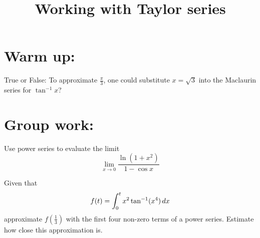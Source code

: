 \documentclass[]{ximera}
\title{Working with Taylor series}
\begin{document}
\begin{abstract}		\end{abstract}
\maketitle



\section{Warm up:}
True or False:  To approximate $\frac{\pi}{3}$, one could substitute $x = \sqrt{3}$ into the Maclaurin series for $\tan^{-1}x$?
	\begin{freeResponse}
	
	\end{freeResponse}
	
\begin{instructorNotes}
\end{instructorNotes}







\section{Group work:}



\begin{problem}
Use power series to evaluate the limit
	\[
	\lim_{x \to 0} \frac{\ln (1+x^2)}{1 - \cos x}
	\]
	
	\begin{freeResponse}
	
	\end{freeResponse}
	
\end{problem}

\begin{instructorNotes}

\end{instructorNotes}







\begin{problem}
Given that
	\[
	f(t) = \int_0^t x^2 \tan^{-1}(x^4) \,d x
	\]
approximate $f \left( \frac{1}{3} \right)$ with the first four non-zero terms of a power series.  
Estimate how close this approximation is.
	
	\begin{freeResponse}
	
	\end{freeResponse}
		
\end{problem}
\end{document}
